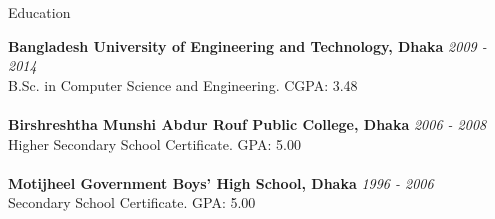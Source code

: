 \documentclass{resume} %
\begin{document}

\begin{rSection}{Education}

{\bf Bangladesh University of Engineering and Technology, Dhaka} \hfill {\em 2009 - 2014} 
\\ B.Sc. in Computer Science and Engineering.\hfill { CGPA: 3.48 }
\\
\\{\bf Birshreshtha Munshi Abdur Rouf Public College, Dhaka} \hfill {\em 2006 - 2008} 
\\ Higher Secondary School Certificate.\hfill { GPA: 5.00 }
\\
\\{\bf Motijheel Government Boys'​ High School, Dhaka} \hfill {\em 1996 - 2006} 
\\ Secondary School Certificate.\hfill { GPA: 5.00 }


\end{rSection}
\end{document}
